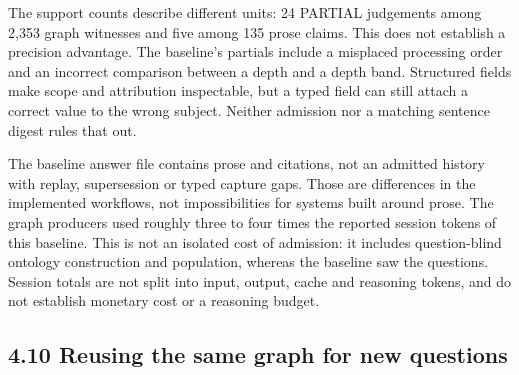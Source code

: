 The support counts describe different units: 24 PARTIAL judgements among 2,353 graph witnesses and five among 135 prose claims. This does not establish a precision advantage. The baseline's partials include a misplaced processing order and an incorrect comparison between a depth and a depth band. Structured fields make scope and attribution inspectable, but a typed field can still attach a correct value to the wrong subject. Neither admission nor a matching sentence digest rules that out.

The baseline answer file contains prose and citations, not an admitted history with replay, supersession or typed capture gaps. Those are differences in the implemented workflows, not impossibilities for systems built around prose. The graph producers used roughly three to four times the reported session tokens of this baseline. This is not an isolated cost of admission: it includes question-blind ontology construction and population, whereas the baseline saw the questions. Session totals are not split into input, output, cache and reasoning tokens, and do not establish monetary cost or a reasoning budget.

\subsection*{4.10 Reusing the same graph for new questions}

